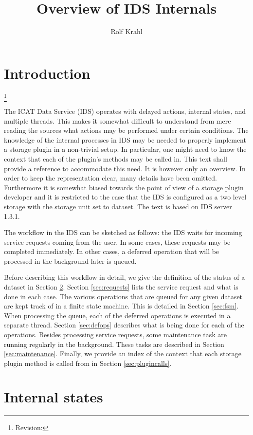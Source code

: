 \documentclass[paper=a4]{scrartcl}
\title{Overview of IDS Internals}
\author{Rolf Krahl}
\newcommand{\revhint}{%
  \begingroup%
  \let\thefootnote\relax%
  \footnote{Revision: }%
  \addtocounter{footnote}{-1}%
  \endgroup%
}
\begin{document}
\maketitle

\section{Introduction}

\revhint{}%
The ICAT Data Service (IDS) operates with delayed actions, internal
states, and multiple threads.  This makes it somewhat difficult to
understand from mere reading the sources what actions may be performed
under certain conditions.  The knowledge of the internal processes in
IDS may be needed to properly implement a storage plugin in a
non-trivial setup.  In particular, one might need to know the context
that each of the plugin's methods may be called in.  This text shall
provide a reference to accommodate this need.  It is however only an
overview.  In order to keep the representation clear, many details
have been omitted.  Furthermore it is somewhat biased towards the
point of view of a storage plugin developer and it is restricted to
the case that the IDS is configured as a two level storage with the
storage unit set to dataset.  The text is based on IDS server 1.3.1.

The workflow in the IDS can be sketched as follows: the IDS waits for
incoming service requests coming from the user.  In some cases, these
requests may be completed immediately.  In other cases, a deferred
operation that will be processed in the background later is queued.

Before describing this workflow in detail, we give the definition of
the status of a dataset in Section \ref{sec:states}.  Section
\ref{sec:requests} lists the service request and what is done in each
case.  The various operations that are queued for any given dataset
are kept track of in a finite state machine.  This is detailed in
Section \ref{sec:fsm}.  When processing the queue, each of the
deferred operations is executed in a separate thread.  Section
\ref{sec:defops} describes what is being done for each of the
operations.  Besides processing service requests, some maintenance
task are running regularly in the background.  These tasks are
described in Section \ref{sec:maintenance}.  Finally, we provide an
index of the context that each storage plugin method is called from in
Section \ref{sec:plugincalls}.


\section{Internal states}
\label{sec:states}
\end{document}
